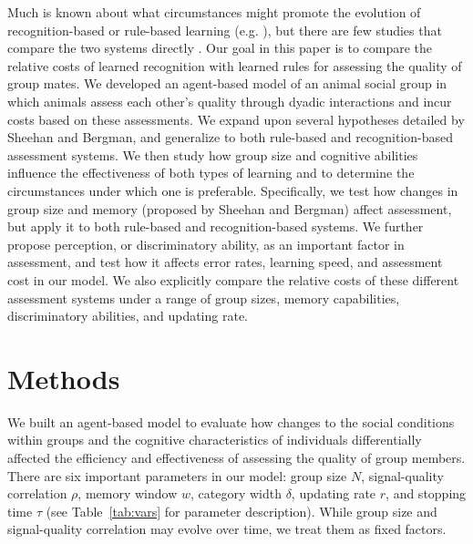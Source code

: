 Much is known about what circumstances might promote the evolution of recognition-based or rule-based learning (e.g. \citep{Whitfield:1987tg,Rohwer:1975fk,Lemel:1993ve,Solberg:1997uq,Tibbetts:2009kx,Remy:2010fk,Sheehan:2014fk}), but there are few studies that compare the two systems directly \citep{sheehan2016evotradeoff}. Our goal in this paper is to compare the relative costs of learned recognition with learned rules for assessing the quality of group mates. We developed an agent-based model of an animal social group in which animals assess each other's quality through dyadic interactions and incur costs based on these assessments. We expand upon several hypotheses detailed by Sheehan and Bergman, and generalize to both rule-based and recognition-based assessment systems. We then study how group size and cognitive abilities influence the effectiveness of both types of learning and to determine the circumstances under which one is preferable. Specifically, we test how changes in group size and memory (proposed by Sheehan and Bergman) affect assessment, but apply it to both rule-based and recognition-based systems. We further propose perception, or discriminatory ability, as an important factor in assessment, and test how it affects error rates, learning speed, and assessment cost in our model. We also explicitly compare the relative costs of these different assessment systems under a range of group sizes, memory capabilities, discriminatory abilities, and updating rate. 


\section*{Methods} 
We built an agent-based model to evaluate how changes to the social conditions within groups and the cognitive characteristics of individuals differentially affected the efficiency and effectiveness of assessing the quality of group members. There are six important parameters in our model: group size $N$, signal-quality correlation $\rho$, memory window $w$, category width $\delta$, updating rate $r$, and stopping time $\tau$ (see Table~\ref{tab:vars} for parameter description). While group size and signal-quality correlation may evolve over time, we treat them as fixed factors. 


